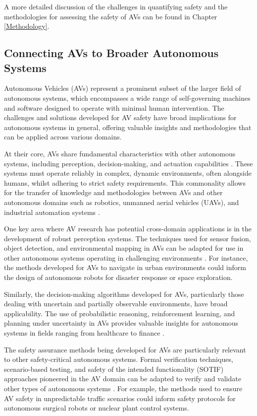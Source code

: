 A more detailed discussion of the challenges in quantifying safety and the methodologies for assessing the safety of AVs can be found in Chapter \ref{Methodology}. %

\subsection{Connecting AVs to Broader Autonomous Systems}

Autonomous Vehicles (AVs) represent a prominent subset of the larger field of autonomous systems, which encompasses a wide range of self-governing machines and software designed to operate with minimal human intervention. The challenges and solutions developed for AV safety have broad implications for autonomous systems in general, offering valuable insights and methodologies that can be applied across various domains.

At their core, AVs share fundamental characteristics with other autonomous systems, including perception, decision-making, and actuation capabilities \cite{Scharre2018}. These systems must operate reliably in complex, dynamic environments, often alongside humans, whilst adhering to strict safety requirements. This commonality allows for the transfer of knowledge and methodologies between AVs and other autonomous domains such as robotics, unmanned aerial vehicles (UAVs), and industrial automation systems \cite{Kaber2018}.

One key area where AV research has potential cross-domain applications is in the development of robust perception systems. The techniques used for sensor fusion, object detection, and environmental mapping in AVs can be adapted for use in other autonomous systems operating in challenging environments \cite{Thrun2005}. For instance, the methods developed for AVs to navigate in urban environments could inform the design of autonomous robots for disaster response or space exploration.

Similarly, the decision-making algorithms developed for AVs, particularly those dealing with uncertain and partially observable environments, have broad applicability. The use of probabilistic reasoning, reinforcement learning, and planning under uncertainty in AVs provides valuable insights for autonomous systems in fields ranging from healthcare to finance \cite{Russell2015}.

The safety assurance methods being developed for AVs are particularly relevant to other safety-critical autonomous systems. Formal verification techniques, scenario-based testing, and safety of the intended functionality (SOTIF) approaches pioneered in the AV domain can be adapted to verify and validate other types of autonomous systems \cite{Koopman2019}. For example, the methods used to ensure AV safety in unpredictable traffic scenarios could inform safety protocols for autonomous surgical robots or nuclear plant control systems.

